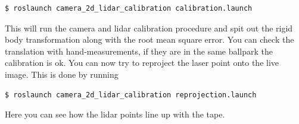 \begin{lstlisting}[language=bash]
$ roslaunch camera_2d_lidar_calibration calibration.launch
\end{lstlisting}

This will run the camera and lidar calibration procedure and spit out the rigid body transformation along with the root mean square error. You can check the translation with hand-measurements, if they are in the same ballpark the calibration is ok. You can now try to reproject the laser point onto the live image. This is done by running 

\begin{lstlisting}[language=bash]
$ roslaunch camera_2d_lidar_calibration reprojection.launch
\end{lstlisting}

Here you can see how the lidar points line up with the tape. 